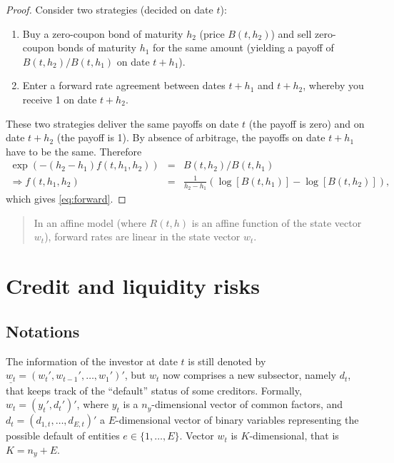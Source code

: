 \documentclass[
  12pt,
]{book}
\providecommand{\tightlist}{%
  \setlength{\itemsep}{0pt}\setlength{\parskip}{0pt}}
\theoremstyle{definition}
\theoremstyle{definition}
\theoremstyle{definition}
\theoremstyle{definition}
\theoremstyle{remark}
\begin{document}
\begin{proof}
Consider two strategies (decided on date \(t\)):

\begin{enumerate}
\def\labelenumi{\arabic{enumi}.}
\tightlist
\item
  Buy a zero-coupon bond of maturity \(h_2\) (price \(B(t,h_2)\)) and sell zero-coupon bonds of maturity \(h_1\) for the same amount (yielding a payoff of \(B(t,h_2)/B(t,h_1)\) on date \(t+h_1\)).
\item
  Enter a forward rate agreement between dates \(t+h_1\) and \(t+h_2\), whereby you receive 1 on date \(t+h_2\).
\end{enumerate}

These two strategies deliver the same payoffs on date \(t\) (the payoff is zero) and on date \(t+h_2\) (the payoff is 1). By absence of arbitrage, the payoffs on date \(t+h_1\) have to be the same. Therefore
\begin{eqnarray*}
\exp(-(h_2 - h_1)f(t,h_1,h_2)) &=& B(t,h_2)/B(t,h_1) \\
\Rightarrow f(t,h_1,h_2) &=& \frac{1}{h_2 - h_1}(\log[B(t,h_1)] - \log[B(t,h_2)]),
\end{eqnarray*}
which gives \eqref{eq:forward}.
\end{proof}

\begin{quote}
In an affine model (where \(R(t,h)\) is an affine function of the state vector \(w_t\)), forward rates are linear in the state vector \(w_t\).
\end{quote}

\hypertarget{CreditLiRisks}{%
\chapter{Credit and liquidity risks}\label{CreditLiRisks}}

\hypertarget{CreditNotations}{%
\section{Notations}\label{CreditNotations}}

The information of the investor at date \(t\) is still denoted by \(\underline{w_t} = (w_t',w_{t-1}',\dots, w_1 ') '\), but \(w_t\) now comprises a new subsector, namely \(d_t\), that keeps track of the ``default'' status of some creditors. Formally, \(w_t = (y_t',d_t')'\), where \(y_t\) is a \(n_y\)-dimensional vector of common factors, and \(d_t = (d_{1, t} , \dots, d_{E, t}) '\) a \(E\)-dimensional vector of binary variables representing the possible default of entities \(e \in \{1, \dots,E\}\). Vector \(w_t\) is \(K\)-dimensional, that is \(K = n_y + E\).
\end{document}
